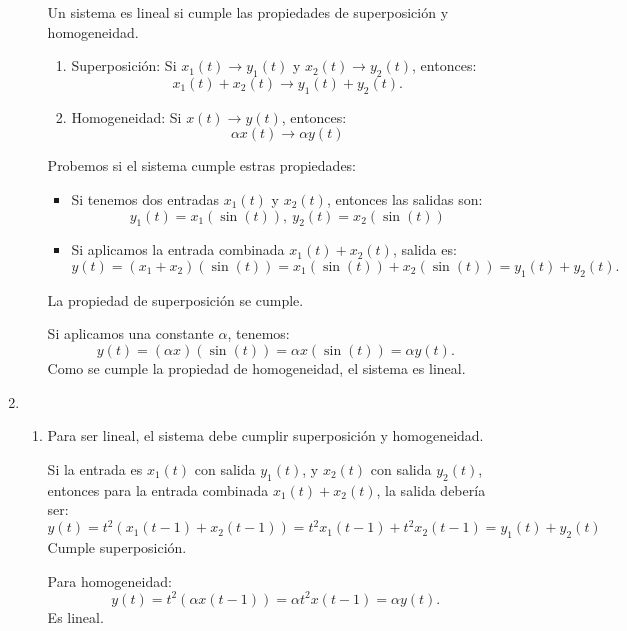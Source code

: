 \begin{enumerate}[label=\color{red}\textbf{\arabic*)}]
\begin{enumerate}[label=\color{red}\textbf{\alph*)}]
        Un sistema es lineal si cumple las propiedades de superposición y homogeneidad.
        \begin{enumerate}[label=\arabic*)]
            \item Superposición: Si $x_1(t)\to y_1(t)$ y $x_2(t)\to y_2(t)$, entonces: \[
            x_1(t)+x_2(t)\to y_1(t)+y_2(t).
            \] 
        \item Homogeneidad: Si $x(t)\to y(t)$, entonces: \[
        \alpha x(t)\to \alpha y(t)
        \] 
        \end{enumerate}
        Probemos si el sistema cumple estras propiedades:
        \begin{itemize}[label=\textbullet]
            \item Si tenemos dos entradas $x_1(t)$ y $x_2(t)$, entonces las salidas son: \[
            y_1(t)=x_1(\sin(t)),\: y_2(t)=x_2(\sin(t))
            \] 
        \item Si aplicamos la entrada combinada $x_1(t)+x_2(t)$, salida es: \[
        y(t)=(x_1+x_2)(\sin(t))=x_1(\sin(t))+x_2(\sin(t))=y_1(t)+y_2(t).
        \] 
        \end{itemize}
        La propiedad de superposición se cumple.

        Si aplicamos una constante $\alpha$, tenemos: \[
        y(t)=(\alpha x)(\sin(t))=\alpha x(\sin(t))=\alpha y(t).
        \] 
        Como se cumple la propiedad de homogeneidad, el sistema es lineal.

\end{enumerate}
\item {}
    \begin{enumerate}[label=\color{red}\textbf{\alph*)}]
        \item {} 

            Para ser lineal, el sistema debe cumplir superposición y homogeneidad.

            Si la entrada es $x_1(t)$ con salida $y_1(t)$, y $x_2(t)$ con salida $y_2(t)$, entonces para la entrada combinada $x_1(t)+x_2(t)$, la salida debería ser: \[
            y(t)=t^2(x_1(t-1)+x_2(t-1))=t^2x_1(t-1)+t^2x_2(t-1)=y_1(t)+y_2(t)
            \] 
            Cumple superposición.

            Para homogeneidad: \[
            y(t)=t^2(\alpha x(t-1))=\alpha t^2x(t-1)=\alpha y(t).
            \] 
            Es lineal.


\end{enumerate}
\end{enumerate}
